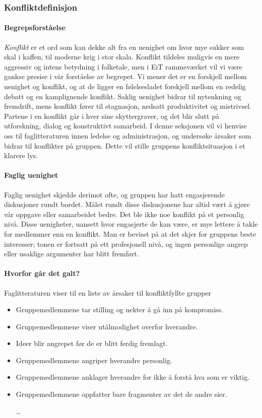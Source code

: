 \subsubsection{Konfliktdefinisjon}

\paragraph{Begrepsforståelse}
\emph{Konflikt} er et ord som kan dekke alt fra en uenighet om hvor mye sukker som skal i kaffen, til moderne krig i stor skala. Konflikt tildeles muligvis en mere aggressiv og intens betydning i folketale, men i EiT rammeværket vil vi være gankse presise i vår forståelse av begrepet. Vi mener det er en forskjell mellom uenighet og konflikt, og at de ligger en følelsesladet forskjell mellom en redelig debatt og en kamplignende konflikt. Saklig uenighet bidrar til nytenkning og fremdrift, mens konflikt fører til stagnasjon, nedsatt produktivitet og mistrivsel\cite{ledernytt}. Partene i en konflikt går i hver sine skyttergraver, og det blir slutt på utforskning, dialog og konstruktivt samarbeid. I denne seksjonen vil vi henvise oss til faglitteraturen innen ledelse og administrasjon, og undersøke årsaker som bidrar til konflikter på gruppen. Dette vil stille gruppens konfliktsituasjon i et klarere lys. 

\paragraph{Faglig uenighet}
Faglig uenighet skjedde derimot ofte, og gruppen har hatt engasjerende diskusjoner rundt bordet. Målet rundt disse diskusjonene har altid vært å gjøre vår oppgave eller samarbeidet bedre. Det ble ikke noe konflikt på et personlig nivå. Disse uenigheter, uansett hvor engasjerte de kan være, er mye lettere å takle for medlemmer enn en konflikt. Man er bevisst på at det skjer for gruppens beste interesser; tonen er fortsatt på ett profesjonell nivå, og ingen personlige angrep eller usaklige argumenter har blitt fremført.

\paragraph{Hvorfor går det galt?}

Faglitteraturen viser til en liste av årsaker til konfliktfyllte grupper\cite[p.~253]{orgorg}

\begin{itemize}

  \item Gruppemedlemmene tar stilling og nekter å gå inn på kompromiss.
  \item Gruppemedlemmene viser utålmodighet overfor hverandre.  
  \item Ideer blir angrepet før de er blitt ferdig fremlagt.
  \item Gruppemedlemmene angriper hverandre personlig.
  \item Gruppemedlemmene anklager hverandre for ikke å forstå hva som er viktig.
  \item Gruppemedlemmene oppfatter bare fragmenter av det de andre sier.  

\ldots
\end{itemize}

